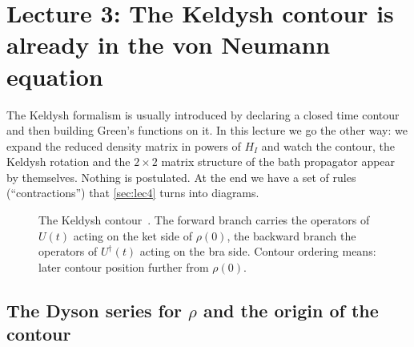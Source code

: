 \section{Lecture 3: The Keldysh contour is already in the von Neumann equation}
\label{sec:lec3}

The Keldysh formalism is usually introduced by declaring a closed time contour and then building Green's functions on it.
In this lecture we go the other way: we expand the reduced density matrix in powers of $H_I$ and watch the contour, the Keldysh rotation and the $2\times2$ matrix structure of the bath propagator appear by themselves.
Nothing is postulated.
At the end we have a set of rules (``contractions'') that \cref{sec:lec4} turns into diagrams.

\begin{figure}[t]
\centering
{}
\caption{The Keldysh contour~\cite{Schwinger1961,Keldysh1964}.
The forward branch carries the operators of $U(t)$ acting on the ket side of $\rho(0)$, the backward branch the operators of $U^\dagger(t)$ acting on the bra side.
Contour ordering means: later contour position further from $\rho(0)$.}
\label{fig:contour}
\end{figure}

\subsection{The Dyson series for \texorpdfstring{$\rho$}{rho} and the origin of the contour}
\label{sec:contour-from-vN}

